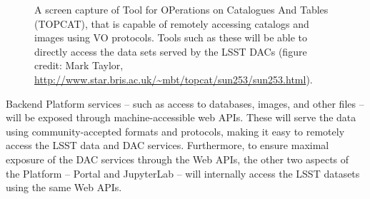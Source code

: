 \documentclass[DM,lsstdraft,toc]{lsstdoc}
\begin{document}
\begin{figure}
	\centering
	\caption{A screen capture of Tool for OPerations on Catalogues And Tables (TOPCAT), that is capable of remotely accessing catalogs and images using VO protocols. Tools such as these will be able to directly access the data sets served by the LSST DACs (figure credit: Mark Taylor, \url{http://www.star.bris.ac.uk/~mbt/topcat/sun253/sun253.html}).
		\label{fig:toolsTOPCAT}}
\end{figure}

Backend Platform services -- such as access to
databases, images, and other files -- will be exposed through
machine-accessible web APIs. These will serve the data using community-accepted
formats and protocols, making it easy to remotely access the LSST data and DAC
services. Furthermore, to ensure maximal exposure of the DAC services through
the Web APIs, the other two aspects of the Platform -- Portal and JupyterLab -- will 
internally access the LSST datasets using the same Web APIs.
\end{document}
